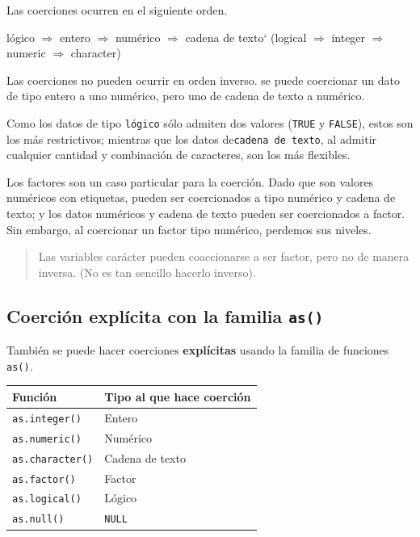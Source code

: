 \documentclass[
]{book}
\begin{document}
Las coerciones ocurren en el siguiente orden.

lógico \(\Rightarrow\) entero \(\Rightarrow\) numérico \(\Rightarrow\) cadena de texto` (logical \(\Rightarrow\) integer \(\Rightarrow\) numeric \(\Rightarrow\) character)

Las coerciones no pueden ocurrir en orden inverso. se puede coercionar un dato de tipo entero a uno numérico, pero uno de cadena de texto a numérico.

Como los datos de tipo \texttt{lógico} sólo admiten dos valores (\texttt{TRUE} y \texttt{FALSE}), estos son los más restrictivos; mientras que los datos de\texttt{cadena\ de\ texto}, al admitir cualquier cantidad y combinación de caracteres, son los más flexibles.

Los factores son un caso particular para la coerción. Dado que son valores numéricos con etiquetas, pueden ser coercionados a tipo numérico y cadena de texto; y los datos numéricos y cadena de texto pueden ser coercionados a factor. Sin embargo, al coercionar un factor tipo numérico, perdemos sus niveles.

\begin{quote}
Las variables carácter pueden coaccionarse a ser factor, pero no de manera inversa. (No es tan sencillo hacerlo inverso).
\end{quote}

\hypertarget{coerciuxf3n-expluxedcita-con-la-familia-as}{%
\subsection{\texorpdfstring{Coerción explícita con la familia \texttt{as()}}{Coerción explícita con la familia as()}}\label{coerciuxf3n-expluxedcita-con-la-familia-as}}

También se puede hacer coerciones \textbf{explícitas} usando la familia de funciones \texttt{as()}.

\begin{longtable}[]{@{}ll@{}}
\toprule()
Función & Tipo al que hace coerción \\
\midrule()
\endhead
\texttt{as.integer()} & Entero \\
\texttt{as.numeric()} & Numérico \\
\texttt{as.character()} & Cadena de texto \\
\texttt{as.factor()} & Factor \\
\texttt{as.logical()} & Lógico \\
\texttt{as.null()} & \texttt{NULL} \\
\bottomrule()
\end{longtable}
\end{document}

